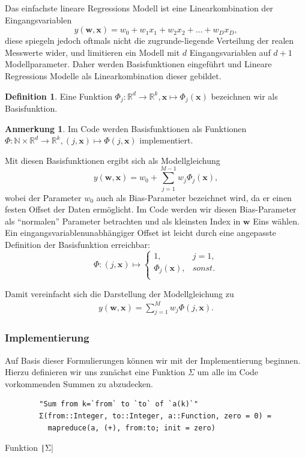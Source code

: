 \documentclass{article}
\theoremstyle{plain} %
\theoremstyle{definition} %
\newtheorem{definition}[theorem]{Definition}
\newtheorem{anno}[theorem]{Anmerkung}
\begin{document}
Das einfachste lineare Regressions Modell ist eine Linearkombination der Eingangsvariablen 
$$
  y(\mathbf{w}, \mathbf{x}) = w_0 + w_1x_1 + w_2x_2 + \hdots + w_Dx_D,
$$
diese spiegeln jedoch oftmals nicht die zugrunde-liegende Verteilung der realen Messwerte wider, und limitieren ein Modell mit $d$ Eingangsvariablen auf $d+1$ Modellparameter. Daher werden Basisfunktionen eingeführt und Lineare Regressions Modelle als Linearkombination dieser gebildet.
\begin{definition}
  Eine Funktion $\Phi_j: \mathbb{R}^d \rightarrow \mathbb{R}^k, \mathbf{x} \mapsto \Phi_j(\mathbf{x})$ bezeichnen wir als Basisfunktion.
\end{definition}
\begin{anno}
  Im Code werden Basisfunktionen als Funktionen $\Phi: \mathbb{N} \times \mathbb{R}^d \rightarrow \mathbb{R}^k, (j, \mathbf{x}) \mapsto \Phi(j, \mathbf{x})$ implementiert.
\end{anno}

Mit diesen Basisfunktionen ergibt sich als Modellgleichung
$$
  y(\mathbf{w}, \mathbf{x}) = w_0 + \sum_{j=1}^{M-1}w_j\Phi_j(\mathbf{x}),
$$
wobei der Parameter $w_0$ auch als Bias-Parameter bezeichnet wird, da er einen festen Offset der Daten ermöglicht. Im Code werden wir diesen Bias-Parameter als ``normalen'' Parameter betrachten und als kleinsten Index in $\mathbf{w}$ Eins wählen. Ein eingangsvariablenunabhängiger Offset ist leicht durch eine angepasste Definition der Basisfunktion erreichbar:
\[ \Phi: (j, \mathbf{x}) \mapsto
 \left\{
  \begin{array}{ll}
    1,& j=1, \\
    \Phi_j(\mathbf{x}), & sonst. \\  
  \end{array}
\right. \]

Damit vereinfacht sich die Darstellung der Modellgleichung zu
\begin{align}
  y(\mathbf{w}, \mathbf{x}) = \sum_{j=1}^{M}w_j\Phi(j, \mathbf{x}). \label{y}
\end{align}

\subsubsection{Implementierung}
Auf Basis dieser Formulierungen können wir mit der Implementierung beginnen.
Hierzu definieren wir uns zunächst eine Funktion \texttt{$\Sigma$} um alle im Code vorkommenden Summen zu abzudecken.

\begin{listing}[H] %
    \begin{verbatim}
        "Sum from k=`from` to `to` of `a(k)`"
        Σ(from::Integer, to::Integer, a::Function, zero = 0) =
          mapreduce(a, (+), from:to; init = zero)
    \end{verbatim}
    \caption{Funktion \texttt|Σ|}
\end{listing}
\end{document}
